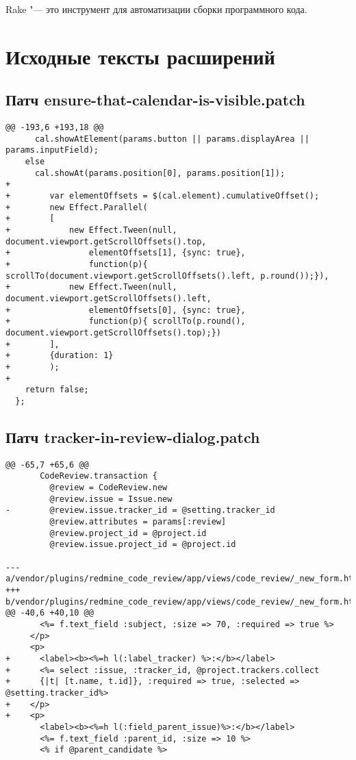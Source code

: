 Rake "--- это инструмент для автоматизации сборки программного кода.


\chapter{Исходные тексты расширений}

\section{Патч ensure-that-calendar-is-visible.patch}
\label{appendix:ensure-that-calendar-is-visible.patch}
\small{\begin{lstlisting}
@@ -193,6 +193,18 @@
      cal.showAtElement(params.button || params.displayArea || params.inputField);
    else
      cal.showAt(params.position[0], params.position[1]);
+
+        var elementOffsets = $(cal.element).cumulativeOffset();
+        new Effect.Parallel(
+        [
+            new Effect.Tween(null, document.viewport.getScrollOffsets().top, 
+                elementOffsets[1], {sync: true},
+                function(p){ scrollTo(document.viewport.getScrollOffsets().left, p.round());}),
+            new Effect.Tween(null, document.viewport.getScrollOffsets().left, 
+                elementOffsets[0], {sync: true},
+                function(p){ scrollTo(p.round(), document.viewport.getScrollOffsets().top);})
+        ],
+        {duration: 1}
+        );
+
    return false;
  };
\end{lstlisting}}

\section{Патч tracker-in-review-dialog.patch}
\label{appendix:tracker-in-review-dialog.patch}
\small{\begin{lstlisting}
@@ -65,7 +65,6 @@
       CodeReview.transaction {
         @review = CodeReview.new
         @review.issue = Issue.new
-        @review.issue.tracker_id = @setting.tracker_id
         @review.attributes = params[:review]
         @review.project_id = @project.id
         @review.issue.project_id = @project.id
         
--- a/vendor/plugins/redmine_code_review/app/views/code_review/_new_form.html.erb
+++ b/vendor/plugins/redmine_code_review/app/views/code_review/_new_form.html.erb
@@ -40,6 +40,10 @@
       <%= f.text_field :subject, :size => 70, :required => true %>
     </p>
     <p>
+      <label><b><%=h l(:label_tracker) %>:</b></label>
+      <%= select :issue, :tracker_id, @project.trackers.collect 
+      {|t| [t.name, t.id]}, :required => true, :selected => @setting.tracker_id%>
+    </p>
+    <p>
       <label><b><%=h l(:field_parent_issue)%>:</b></label>
       <%= f.text_field :parent_id, :size => 10 %>
       <% if @parent_candidate %>
\end{lstlisting}}

